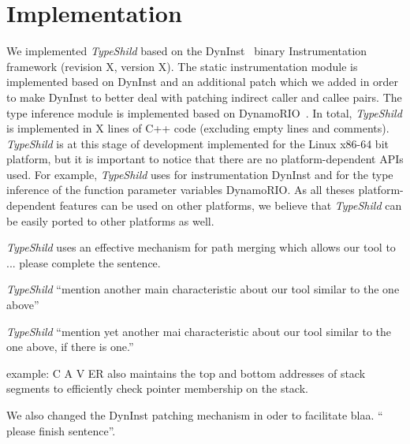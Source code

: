 \chapter{Implementation}
\label{chapter:Implementation}

We implemented \textit{TypeShild} based on the DynInst~\cite{bernat:dyninst}
binary Instrumentation framework (revision X, version X).
The static instrumentation module is implemented based on DynInst
and an additional patch which we added in order to make DynInst to
better deal with patching indirect caller and callee pairs.
The type inference module is implemented based on DynamoRIO~\cite{dynamorio:drmemory}.
In total, \textit{TypeShild} is implemented in X lines of C++ 
code (excluding empty lines and comments).
\textit{TypeShild} is at this stage of development implemented 
for the Linux x86-64 bit platform, but it is important to notice that there are
no platform-dependent APIs used.
For example, \textit{TypeShild} uses for instrumentation
DynInst and for the type inference of the function parameter variables
DynamoRIO. As all theses platform-dependent features can be used on other platforms,
we believe that \textit{TypeShild} can be easily ported to other platforms as well.

\textit{TypeShild} uses an effective mechanism for path merging which allows
our tool to ... please complete the sentence.

\textit{TypeShild} ``mention another main characteristic about our tool similar to the one above''

\textit{TypeShild} ``mention yet another mai characteristic about our tool similar to the one above, if there is one.''

example: C A V ER also maintains the
top and bottom addresses of stack segments to efficiently
check pointer membership on the stack. 

We also changed the DynInst patching mechanism in oder to facilitate blaa. `` please finish sentence''.



